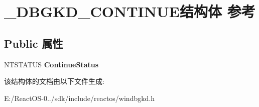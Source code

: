 \hypertarget{struct___d_b_g_k_d___c_o_n_t_i_n_u_e}{}\section{\+\_\+\+D\+B\+G\+K\+D\+\_\+\+C\+O\+N\+T\+I\+N\+U\+E结构体 参考}
\label{struct___d_b_g_k_d___c_o_n_t_i_n_u_e}
\subsection*{Public 属性}
\begin{DoxyCompactItemize}
\item 
\mbox{\label{struct___d_b_g_k_d___c_o_n_t_i_n_u_e_ac7526e7cd9e0a6758ad4612c799de0fe}} 
N\+T\+S\+T\+A\+T\+US {\bfseries Continue\+Status}
\end{DoxyCompactItemize}


该结构体的文档由以下文件生成\+:\begin{DoxyCompactItemize}
\item 
E\+:/\+React\+O\+S-\/0../sdk/include/reactos/windbgkd.\+h\end{DoxyCompactItemize}

